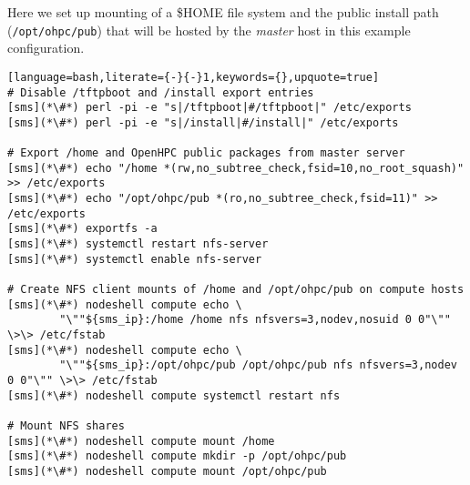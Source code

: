 Here we set up \NFS{}  mounting of a
\$HOME file system and the public \OHPC{} install path (\texttt{/opt/ohpc/pub})
that will be hosted by the {\em master} host in this  example configuration.

\vspace*{0.15cm}
\begin{lstlisting}[language=bash,literate={-}{-}1,keywords={},upquote=true]
# Disable /tftpboot and /install export entries
[sms](*\#*) perl -pi -e "s|/tftpboot|#/tftpboot|" /etc/exports
[sms](*\#*) perl -pi -e "s|/install|#/install|" /etc/exports

# Export /home and OpenHPC public packages from master server
[sms](*\#*) echo "/home *(rw,no_subtree_check,fsid=10,no_root_squash)" >> /etc/exports
[sms](*\#*) echo "/opt/ohpc/pub *(ro,no_subtree_check,fsid=11)" >> /etc/exports
[sms](*\#*) exportfs -a
[sms](*\#*) systemctl restart nfs-server
[sms](*\#*) systemctl enable nfs-server

# Create NFS client mounts of /home and /opt/ohpc/pub on compute hosts
[sms](*\#*) nodeshell compute echo \
        "\""${sms_ip}:/home /home nfs nfsvers=3,nodev,nosuid 0 0"\"" \>\> /etc/fstab
[sms](*\#*) nodeshell compute echo \
        "\""${sms_ip}:/opt/ohpc/pub /opt/ohpc/pub nfs nfsvers=3,nodev 0 0"\"" \>\> /etc/fstab
[sms](*\#*) nodeshell compute systemctl restart nfs

# Mount NFS shares
[sms](*\#*) nodeshell compute mount /home
[sms](*\#*) nodeshell compute mkdir -p /opt/ohpc/pub
[sms](*\#*) nodeshell compute mount /opt/ohpc/pub

\end{lstlisting}

